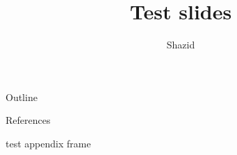 \documentclass[12pt, aspectratio=169]{beamer}
\title{Test slides}
\author{Shazid}
\begin{document}
	{
		\addtocounter{framenumber}{-2}    %

		\begin{frame}
			\titlepage
		\end{frame}

		\begin{frame}{Outline}
			\tableofcontents[subsectionstyle=hide]
		\end{frame}
	}

	

	\appendix

	\begingroup
		\renewcommand{\section}[2]{}%
		\begin{frame}[allowframebreaks]{References}
			\Wider{
				\def\bibfont{\footnotesize}
				
			}
		\end{frame}
	\endgroup

    \begin{frame}
        test appendix frame
    \end{frame}
\end{document}
